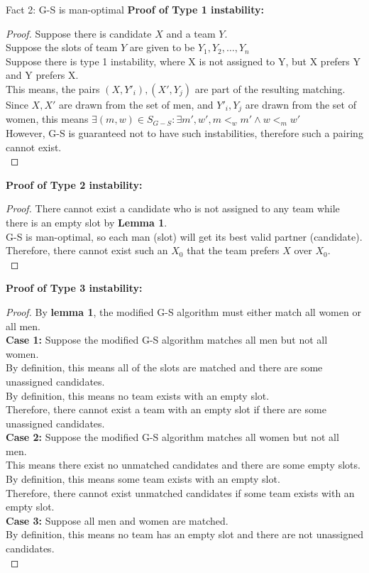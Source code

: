 \begin{problem}
    Fact 2: G-S is man-optimal
    \noindent
    \textbf{Proof of Type 1 instability:}
    \begin{proof}
      Suppose there is candidate $X$ and a team $Y$. \\
      Suppose the slots of team $Y$ are given to be $Y_{1}, Y_{2}, \dots, Y_{n}$ \\
      Suppose there is type 1 instability, where X is not assigned to Y, but X prefers Y and Y prefers X. \\
      This means, the pairs $(X, Y'_i), (X', Y_j)$ are part of the resulting matching. \\
      Since $X, X'$ are drawn from the set of men, and $Y'_i, Y_j$ are drawn from the set of women, this means $\exists (m, w) \in S_{G-S} : \exists m', w', m <_{w} m' \land w <_{m} w'$ \\
      However, G-S is guaranteed not to have such instabilities, therefore such a pairing cannot exist. \\
    \end{proof}
    \noindent
    \textbf{Proof of Type 2 instability:}
    \begin{proof}
    There cannot exist a candidate who is not assigned to any team while there is an empty slot by \textbf{Lemma 1}. \\
    G-S is man-optimal, so each man (slot) will get its best valid partner (candidate). Therefore, there cannot exist such an $X_0$ that the team prefers $X$ over $X_0$. \\
    \end{proof}
    \noindent
    \textbf{Proof of Type 3 instability:}
    \begin{proof}
    By \textbf{lemma 1}, the modified G-S algorithm must either match all women or all men. \\
    \textbf{Case 1:} Suppose the modified G-S algorithm matches all men but not all women. \\
    By definition, this means all of the slots are matched and there are some unassigned candidates. \\
    By definition, this means no team exists with an empty slot. \\
    Therefore, there cannot exist a team with an empty slot if there are some unassigned candidates. \\
    \textbf{Case 2:} Suppose the modified G-S algorithm matches all women but not all men. \\
    This means there exist no unmatched candidates and there are some empty slots. \\
    By definition, this means some team exists with an empty slot. \\
    Therefore, there cannot exist unmatched candidates if some team exists with an empty slot. \\
    \textbf{Case 3:} Suppose all men and women are matched. \\
    By definition, this means no team has an empty slot and there are not unassigned candidates. \\
    \end{proof}
\end{problem}
